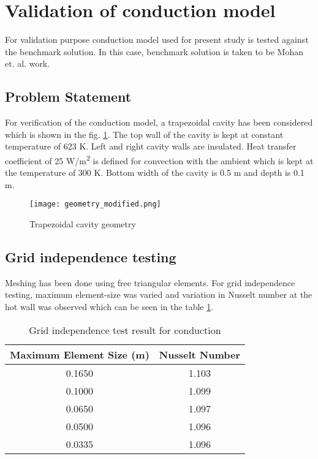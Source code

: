 \section{Validation of conduction model}\label{sec:validationConduction}
For validation purpose conduction model used for present study is tested against the benchmark solution. In this case, benchmark solution is taken to be Mohan et. al.\citep{MOHAN201837} work.
\subsection{Problem Statement}
For verification of the conduction model, a trapezoidal cavity has been considered which is shown in the fig. \ref{geometry_modified}. The top wall of the cavity is kept at constant temperature of 623 K. Left and right cavity walls are insulated. Heat transfer coefficient of 25 W/m\textsuperscript{2} is defined for convection with the ambient which is kept at the temperature of 300 K. Bottom width of the cavity is 0.5 m and depth is 0.1 m.

\begin{figure}[H]
\begin{center}
\texttt{[image: geometry\_modified.png]}
\caption{Trapezoidal cavity geometry}
\label{geometry_modified}
\end{center}
\end{figure}
\subsection{Grid independence testing}
Meshing has been done using free triangular elements. For grid independence testing, maximum element-size was varied and variation in Nusselt number at the hot wall was observed which can be seen in the table \ref{gridTestCond}. 


\begin{table}[H]
\centering
\caption{Grid independence test result for conduction}
\label{gridTestCond}
\begin{tabular}{@{}|c|c|@{}}
\toprule
\textbf{Maximum Element Size (m)} & \textbf{Nusselt Number} \\ \midrule
0.1650                             & 1.103                  \\ \midrule
0.1000                            & 1.099                  \\ \midrule
0.0650                            & 1.097                  \\ \midrule
0.0500                            & 1.096                  \\ \midrule
0.0335                            & 1.096                  \\ \bottomrule
\end{tabular}
\end{table}

